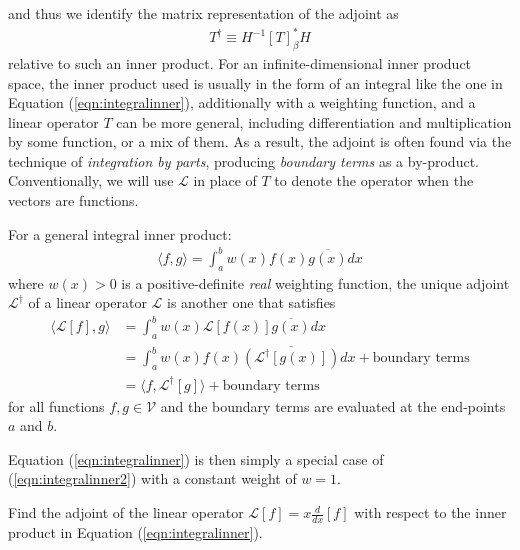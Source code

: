 and thus we identify the matrix representation of the adjoint as 
\begin{align}
T^\dag \equiv H^{-1} [T]_\beta^* H \label{eqn:adjointformatrix}
\end{align} relative to such an inner product. For an infinite-dimensional inner product space, the inner product used is usually in the form of an integral like the one in Equation (\ref{eqn:integralinner}), additionally with a weighting function, and a linear operator $T$ can be more general, including differentiation and multiplication by some function, or a mix of them. As a result, the adjoint is often found via the technique of \textit{integration by parts}, producing \textit{boundary terms} as a by-product. Conventionally, we will use $\mathcal{L}$ in place of $T$ to denote the operator when the vectors are functions.
\begin{proper}
\label{proper:adjointinnerint}
For a general integral inner product:
\begin{align}
\langle f,g \rangle = \int_a^b w(x) f(x) \overline{g(x)} dx \label{eqn:integralinner2}
\end{align}
where $w(x) > 0$ is a positive-definite \textit{real} weighting function, the unique adjoint $\mathcal{L}^\dagger$ of a linear operator $\mathcal{L}$ is another one that satisfies
\begin{align}
\langle \mathcal{L}[f], g \rangle &= \int_a^b w(x) \mathcal{L}[f(x)] \overline{g(x)} dx \nonumber \\ 
&= \int_a^b w(x) f(x) \overline{(\mathcal{L^\dag}[g(x)])} dx + \text{boundary terms} \nonumber \\
&= \langle f, \mathcal{L}^\dag[g] \rangle + \text{boundary terms}
\end{align}
for all functions $f, g \in \mathcal{V}$ and the boundary terms are evaluated at the end-points $a$ and $b$.
\end{proper}
Equation (\ref{eqn:integralinner}) is then simply a special case of (\ref{eqn:integralinner2}) with a constant weight of $w = 1$.
\begin{exmp}
Find the adjoint of the linear operator $\mathcal{L}[f] = x\frac{d}{dx}[f]$ with respect to the inner product in Equation (\ref{eqn:integralinner}).
\end{exmp}
